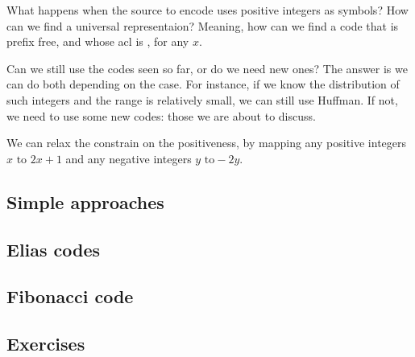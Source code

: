 \documentclass{subfiles}
\begin{document}
\label{Sec:4}
    What happens when the source to encode uses positive integers as symbols?
        How can we find a universal representaion? 
        Meaning, how can we find a code that is prefix free,
        and whose \gls{acl} is , for any \(x\).

    Can we still use the codes seen so far, or do we need new ones?
        The answer is we can do both depending on the case.
        For instance, if we know the distribution of such integers and the range is
        relatively small, we can still use Huffman. 
        If not, we need to use some new codes: those we are about to discuss.

    \begin{remark*}
        We can relax the constrain on the positiveness, 
            by mapping any positive integers \(x \text{ to } 2x + 1\) and 
            any negative integers \(y \text{ to} -2y\).
    \end{remark*}

    \subsection{Simple approaches}
    

    \subsection{Elias codes}
    

    \subsection{Fibonacci code}
    

    \subsection{Exercises}
    
\end{document}
